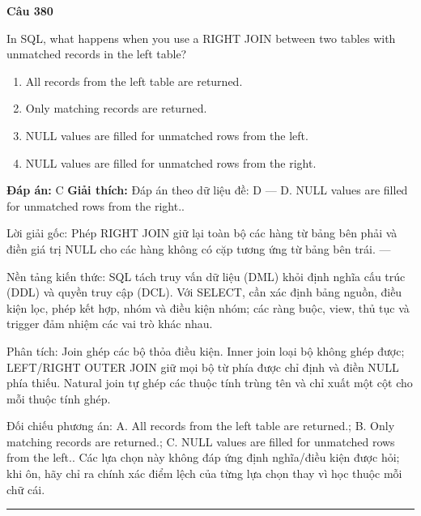 \documentclass[11pt,a4paper]{article}
\newenvironment{question}[1]{%
  \par\vspace{1em}\noindent\textbf{\large Câu #1}\par\vspace{0.4em}
}{%
  \par\vspace{1em}\hrule\vspace{0.6em}
}
\newenvironment{choices}{%
  \begin{enumerate}[label=\textbf{\Alph*.},leftmargin=2.2em,itemsep=2pt,topsep=3pt]
}{%
  \end{enumerate}
}
\newcommand{\choice}{\item}
\begin{document}
\begin{question}{380}
In SQL, what happens when you use a RIGHT JOIN between two tables with unmatched records in the left table?
\begin{choices}
\choice All records from the left table are returned.
\choice Only matching records are returned.
\choice NULL values are filled for unmatched rows from the left.
\choice NULL values are filled for unmatched rows from the right.
\end{choices}
\textbf{Đáp án:} C
\textbf{Giải thích:} Đáp án theo dữ liệu đề: D — D. NULL values are filled for unmatched rows from the right..

Lời giải gốc: Phép RIGHT JOIN giữ lại toàn bộ các hàng từ bảng bên phải và điền giá trị NULL cho các hàng không có cặp tương ứng từ bảng bên trái. ---

Nền tảng kiến thức: SQL tách truy vấn dữ liệu (DML) khỏi định nghĩa cấu trúc (DDL) và quyền truy cập (DCL). Với SELECT, cần xác định bảng nguồn, điều kiện lọc, phép kết hợp, nhóm và điều kiện nhóm; các ràng buộc, view, thủ tục và trigger đảm nhiệm các vai trò khác nhau.

Phân tích: Join ghép các bộ thỏa điều kiện. Inner join loại bộ không ghép được; LEFT/RIGHT OUTER JOIN giữ mọi bộ từ phía được chỉ định và điền NULL phía thiếu. Natural join tự ghép các thuộc tính trùng tên và chỉ xuất một cột cho mỗi thuộc tính ghép.

Đối chiếu phương án: A. All records from the left table are returned.; B. Only matching records are returned.; C. NULL values are filled for unmatched rows from the left.. Các lựa chọn này không đáp ứng định nghĩa/điều kiện được hỏi; khi ôn, hãy chỉ ra chính xác điểm lệch của từng lựa chọn thay vì học thuộc mỗi chữ cái.
\end{question}
\end{document}
